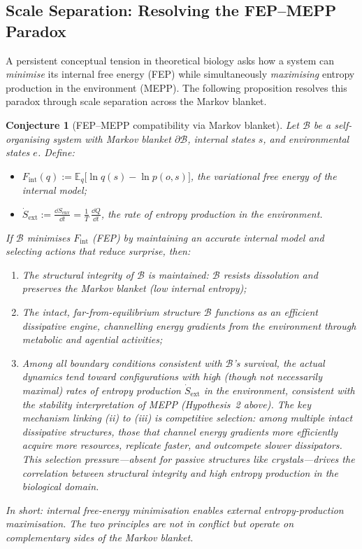 \documentclass[12pt,a4paper]{article}
\newtheorem{conjecture}{Conjecture}
\theoremstyle{remark}
\begin{document}
\subsection{Scale Separation: Resolving the FEP--MEPP Paradox}
\label{sec:fep-mepp-paradox}

A persistent conceptual tension in theoretical biology asks how a system
can \emph{minimise} its internal free energy (FEP) while simultaneously
\emph{maximising} entropy production in the environment (MEPP). The
following proposition resolves this paradox through scale separation
across the Markov blanket.

\begin{conjecture}[FEP--MEPP compatibility via Markov blanket]
\label{conj:fep-mepp}
Let $\mathcal{B}$ be a self-organising system with Markov blanket
$\partial\mathcal{B}$, internal states $s$, and environmental
states $e$. Define:
\begin{itemize}
  \item $F_{\mathrm{int}}(q) :=
    \mathbb{E}_{q}\!\bigl[\ln q(s) - \ln p(o, s)\bigr]$,
    the variational free energy of the internal model;
  \item $\dot{S}_{\mathrm{ext}} :=
    \frac{\dd S_{\mathrm{env}}}{\dd t} =
    \frac{1}{T}\,\frac{\dd Q}{\dd t}$,
    the rate of entropy production in the environment.
\end{itemize}
If $\mathcal{B}$ minimises $F_{\mathrm{int}}$ (FEP) by maintaining an
accurate internal model and selecting actions that reduce surprise, then:
\begin{enumerate}
  \item[\emph{(i)}] The structural integrity of $\mathcal{B}$ is
    maintained: $\mathcal{B}$ resists dissolution and preserves the
    Markov blanket (low internal entropy);
  \item[\emph{(ii)}] The intact, far-from-equilibrium structure
    $\mathcal{B}$ functions as an efficient dissipative engine,
    channelling energy gradients from the environment through
    metabolic and agential activities;
  \item[\emph{(iii)}] Among all boundary conditions consistent with
    $\mathcal{B}$'s survival, the actual dynamics tend toward
    configurations with high (though not necessarily maximal) rates
    of entropy production $\dot{S}_{\mathrm{ext}}$ in the environment,
    consistent with the stability interpretation of MEPP
    (Hypothesis~2 above). The key mechanism linking (ii) to (iii) is
    \emph{competitive selection}: among multiple intact dissipative
    structures, those that channel energy gradients more efficiently
    acquire more resources, replicate faster, and outcompete slower
    dissipators. This selection pressure---absent for passive
    structures like crystals---drives the correlation between
    structural integrity and high entropy production in the
    biological domain.
\end{enumerate}
In short: \emph{internal free-energy minimisation enables external
entropy-production maximisation}. The two principles are not in
conflict but operate on complementary sides of the Markov blanket.
\end{conjecture}
\end{document}
